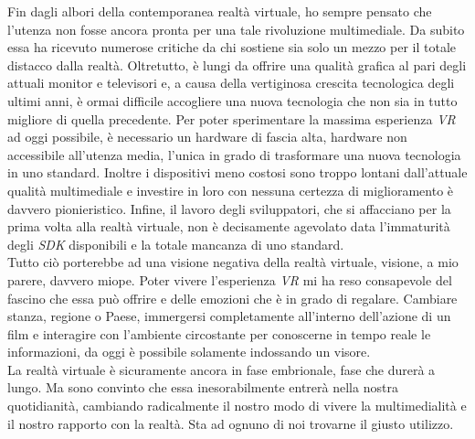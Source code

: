 Fin dagli albori della contemporanea realtà virtuale, ho sempre pensato che l'utenza non fosse ancora pronta per una tale rivoluzione multimediale. Da subito essa ha ricevuto numerose critiche da chi sostiene sia solo un mezzo per il totale distacco dalla realtà. Oltretutto, è lungi da offrire una qualità grafica al pari degli attuali monitor e televisori e, a causa della vertiginosa crescita tecnologica degli ultimi anni, è ormai difficile accogliere una nuova tecnologia che non sia in tutto migliore di quella precedente. Per poter sperimentare la massima esperienza \textit{VR} ad oggi possibile, è necessario un hardware di fascia alta, hardware non accessibile all'utenza media, l'unica in grado di trasformare una nuova tecnologia in uno standard. Inoltre i dispositivi meno costosi sono troppo lontani dall'attuale qualità multimediale e investire in loro con nessuna certezza di miglioramento è davvero pionieristico. Infine, il lavoro degli sviluppatori, che si affacciano per la prima volta alla realtà virtuale, non è decisamente agevolato data l'immaturità degli \textit{SDK} disponibili e la totale mancanza di uno standard. \\ 
Tutto ciò porterebbe ad una visione negativa della realtà virtuale, visione, a mio parere, davvero miope. Poter vivere l'esperienza \textit{VR} mi ha reso consapevole del fascino che essa può offrire e delle emozioni che è in grado di regalare. Cambiare stanza, regione o Paese, immergersi completamente all'interno dell'azione di un film e interagire con l'ambiente circostante per conoscerne in tempo reale le informazioni, da oggi è possibile solamente indossando un visore. \\
La realtà virtuale è sicuramente ancora in fase embrionale, fase che durerà a lungo. Ma sono convinto che essa inesorabilmente entrerà nella nostra quotidianità, cambiando radicalmente il nostro modo di vivere la multimedialità e il nostro rapporto con la realtà. Sta ad ognuno di noi trovarne il giusto utilizzo.  